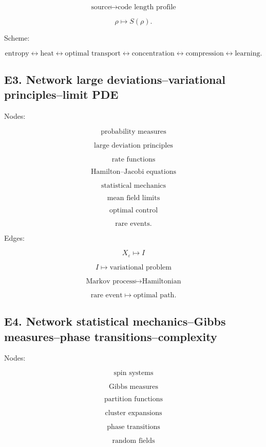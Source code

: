 \documentclass[11pt]{article}
\begin{document}
\[
\text{source}\mapsto \text{code length profile}
\]

\[
\rho\mapsto S(\rho).
\]

Scheme:

\[
\text{entropy}
\leftrightarrow
\text{heat}
\leftrightarrow
\text{optimal transport}
\leftrightarrow
\text{concentration}
\leftrightarrow
\text{compression}
\leftrightarrow
\text{learning}.
\]



\subsection{E3. Network large deviations--variational principles--limit PDE}

Nodes:

\[
\text{probability measures}
\]

\[
\text{large deviation principles}
\]

\[
\text{rate functions}
\]

\[
\text{Hamilton--Jacobi equations}
\]

\[
\text{statistical mechanics}
\]

\[
\text{mean field limits}
\]

\[
\text{optimal control}
\]

\[
\text{rare events}.
\]

Edges:

\[
X_\varepsilon\mapsto I
\]

\[
I\mapsto \text{variational problem}
\]

\[
\text{Markov process}\mapsto \text{Hamiltonian}
\]

\[
\text{rare event}\mapsto \text{optimal path}.
\]



\subsection{E4. Network statistical mechanics--Gibbs measures--phase transitions--complexity}

Nodes:

\[
\text{spin systems}
\]

\[
\text{Gibbs measures}
\]

\[
\text{partition functions}
\]

\[
\text{cluster expansions}
\]

\[
\text{phase transitions}
\]

\[
\text{random fields}
\]
\end{document}
